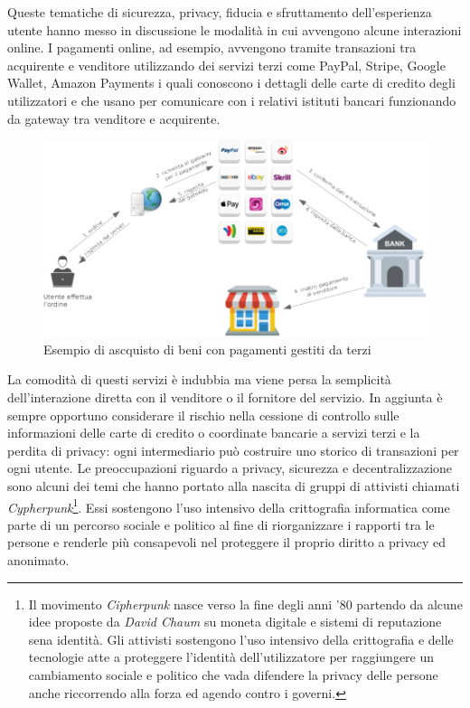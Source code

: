 Queste tematiche di sicurezza, privacy, fiducia e sfruttamento dell'esperienza utente hanno messo in discussione le modalità in cui avvengono alcune interazioni online. I pagamenti online, ad esempio, avvengono tramite transazioni tra acquirente e venditore utilizzando dei servizi terzi come PayPal, Stripe, Google Wallet, Amazon Payments i quali conoscono i dettagli delle carte di credito degli utilizzatori e che usano per comunicare con i relativi istituti bancari funzionando da gateway tra venditore e acquirente.\newline
\begin{figure}
    \centering
    \includegraphics[scale=0.5]{images/onlinepayments.png}
    \caption{Esempio di ascquisto di beni con pagamenti gestiti da terzi}
\end{figure}
La comodità di questi servizi è indubbia ma viene persa la semplicità dell'interazione diretta con il venditore o il fornitore del servizio. In aggiunta è sempre opportuno considerare il rischio nella cessione di controllo sulle informazioni delle carte di credito o coordinate bancarie a servizi terzi e la perdita di privacy: ogni intermediario può costruire uno storico di transazioni per ogni utente.\newline\newline
Le preoccupazioni riguardo a privacy, sicurezza e decentralizzazione sono alcuni dei temi che hanno portato alla nascita di gruppi di attivisti chiamati \textit{Cypherpunk}\footnote{Il movimento \textit{Cipherpunk} nasce verso la fine degli anni '80 partendo da alcune idee proposte da \textit{David Chaum} su moneta digitale e sistemi di reputazione sena identità. Gli attivisti sostengono l'uso intensivo della crittografia e delle tecnologie atte a proteggere l'identità dell'utilizzatore per raggiungere un cambiamento sociale e politico che vada difendere la privacy delle persone anche riccorrendo alla forza ed agendo contro i governi.}. Essi sostengono l'uso intensivo della crittografia informatica come parte di un percorso sociale e politico al fine di riorganizzare i rapporti tra le persone e renderle più consapevoli nel proteggere il proprio diritto a privacy ed anonimato.\newline\newline
